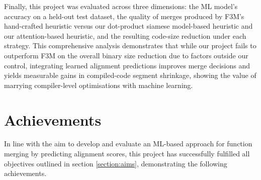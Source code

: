 Finally, this project was evaluated across three dimensions: the ML model’s accuracy on a held-out test dataset, the quality of merges produced by F3M’s hand-crafted heuristic versus our dot-product siamese model-based heuristic and our attention-based heuristic, and the resulting code-size reduction under each strategy. This comprehensive analysis demonstrates that while our project fails to outperform F3M on the overall binary size reduction due to factors outside our control, integrating learned alignment predictions improves merge decisions and yields measurable gains in compiled-code segment shrinkage, showing the value of marrying compiler-level optimisations with machine learning.

\section{Achievements} \label{Conc:Achievements}
In line with the aim to develop and evaluate an ML-based approach for function merging by predicting alignment scores, this project has successfully fulfilled all objectives outlined in section \ref{section:aims}, demonstrating the following achievements.

